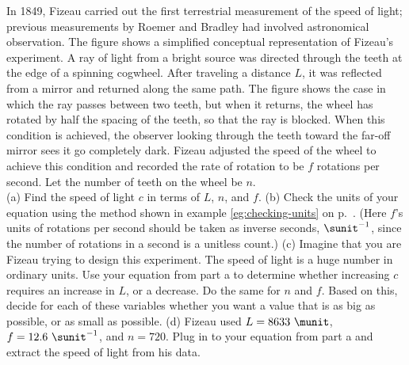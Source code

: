 In 1849, Fizeau carried out the first terrestrial measurement of the speed of light;
previous measurements by Roemer and Bradley had involved astronomical observation.
The figure shows a simplified conceptual representation of Fizeau's experiment.
A ray of light from a bright source was directed through the teeth at the edge of
a spinning cogwheel. After traveling a distance $L$, it was reflected from a mirror
and returned along the same path. The figure shows the case in which the ray passes
between two teeth, but when it returns, the wheel has rotated by half the spacing
of the teeth, so that the ray is blocked. When this condition is achieved, the
observer looking through the teeth toward the far-off mirror sees it go completely
dark. Fizeau adjusted the speed of the wheel to achieve this condition and recorded
the rate of rotation to be $f$ rotations per second. Let the number of teeth on the
wheel be $n$.\\
(a) Find the speed of light $c$ in terms of $L$, $n$, and $f$.\answercheck\hwendpart
(b) Check the units of your equation using the method shown in example \ref{eg:checking-units}
on p.~\pageref{eg:checking-units}. (Here $f$'s units of rotations per second should be
taken as inverse seconds, $\sunit^{-1}$, since the number of rotations in a second is
a unitless count.)\hwendpart
(c) Imagine that you are Fizeau trying to design this experiment. The speed of light is
a huge number in ordinary units. Use your equation from part a to determine whether
increasing $c$ requires an increase in $L$, or a decrease. Do the same for $n$ and $f$.
Based on this, decide for each of these variables whether you want a value that is as
big as possible, or as small as possible.\hwendpart
(d) Fizeau used $L=8633\ \munit$, $f=12.6\ \sunit^{-1}$, and $n=720$. Plug in to your
equation from part a and extract the speed of light from his data.\answercheck\hwendpart
